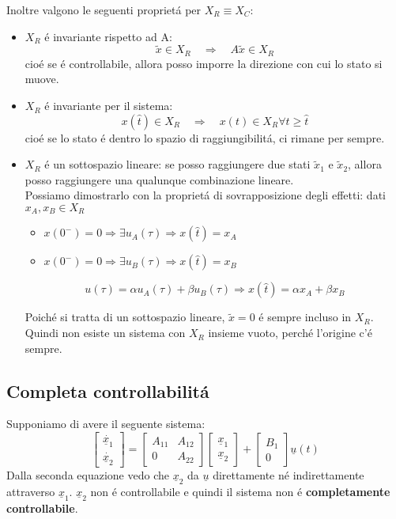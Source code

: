 \documentclass[../main.tex]{subfiles}
\begin{document}
		Inoltre valgono le seguenti propriet\'a per $ X_R \equiv X_C $:
		\begin{itemize}
			\item
				$ X_R $ \'e invariante rispetto ad A:
				\[ \tilde x \in X_R \quad\Rightarrow\quad A \tilde x \in X_R \]
				cio\'e se \'e controllabile, allora posso imporre la direzione con cui lo stato si muove.
			\item
				$ X_R $ \'e invariante per il sistema:
				\[ x(\hat t) \in X_R \quad\Rightarrow\quad x(t) \in X_R \forall t \geq \hat t \]
				cio\'e se lo stato \'e dentro lo spazio di raggiungibilit\'a, ci rimane per sempre.
			\item
				$ X_R $ \'e un sottospazio lineare: se posso raggiungere due stati $ \tilde x_1 $ e $ \tilde x_2 $, allora posso raggiungere una qualunque combinazione lineare.\\
				Possiamo dimostrarlo con la propriet\'a di sovrapposizione degli effetti:
				dati $ x_A, x_B \in X_R $
				\begin{itemize}
					\item $ x(0^-) = 0 \Rightarrow \exists u_A(\tau) \Rightarrow x(\hat t) = x_A $
					\item $ x(0^-) = 0 \Rightarrow \exists u_B(\tau) \Rightarrow x(\hat t) = x_B $
				\end{itemize}
				\[ u(\tau) = \alpha u_A(\tau) + \beta u_B(\tau) \Rightarrow x(\hat t) = \alpha x_A + \beta x_B \]
				
				Poich\'e si tratta di un sottospazio lineare, $ \tilde x = 0 $ \'e sempre incluso in $ X_R $. Quindi non esiste un sistema con $ X_R $ insieme vuoto, perch\'e l'origine c'\'e sempre.
		\end{itemize}
		
	\subsection{Completa controllabilit\'a}
		Supponiamo di avere il seguente sistema:
		\[
			\begin{bmatrix}
				\dot{\underline x_1} \\ \dot{\underline x_2}
			\end{bmatrix} = 
			\begin{bmatrix}
				A_{11} & A_{12}\\
				0 & A_{22}
			\end{bmatrix}
			\begin{bmatrix}
				\underline x_1 \\ \underline x_2
			\end{bmatrix} +
			\begin{bmatrix}
				B_1 \\ 0
			\end{bmatrix} \underline u(t)
		\]
		Dalla seconda equazione vedo che $ \underline x_2 $ da $ \underline u $ direttamente n\'e indirettamente attraverso $ \underline x_1 $. $ \underline x_2 $ non \'e controllabile e quindi il sistema non \'e \textbf{completamente controllabile}.
	
\end{document}
